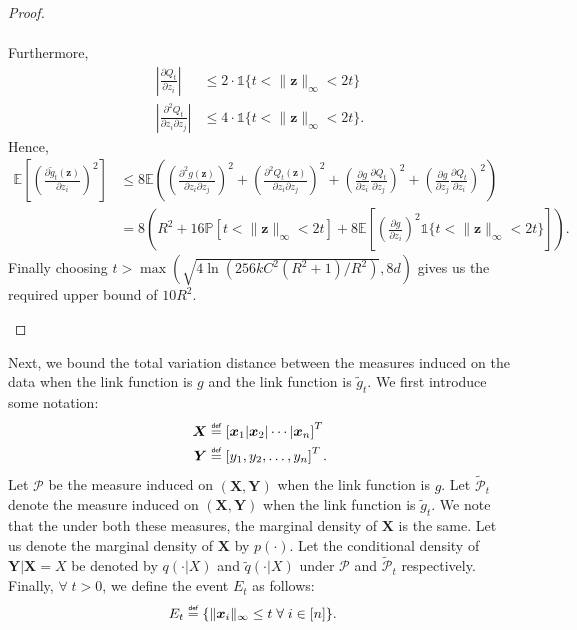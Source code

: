\documentclass[final,12pt]{colt2018} %
\newcommand{\E}{\mathbb{E}}
\newcommand{\Prob}{\mathbb{P}}
\newcommand{\explain}[2]{\mathrel{\overset{\makebox[0pt]{\mbox{\normalfont\tiny\sffamily #1}}}{#2}}}
\renewcommand\v[1]{{\ensuremath{\boldsymbol{#1}}}}
\newcommand{\indicator}[1]{\mathds{1}\{#1\}}
\begin{document}
\begin{proof}
\begin{enumerate}
\begin{align*}
    \end{align*}
    Furthermore,
    \begin{align*}
        \left|\frac{\partial Q_t}{\partial z_i}\right| & \leq  2 \cdot \indicator{ t <\|\v z\|_\infty< 2t} \\
        \left|\frac{\partial^2 Q_t}{\partial z_i\partial z_j}\right| & \leq  4 \cdot \indicator{ t <\|\v z\|_\infty< 2t}.
    \end{align*}
    Hence,
    \begin{align*}
        \E\left[\left( \frac{\partial \tilde{g}_t(\v z)}{\partial z_i}\right)^2\right] & \leq 8 \E \left( \left( \frac{\partial^2 g(\v z)}{\partial z_i \partial z_j}\right)^2 + \left( \frac{\partial^2 Q_t(\v z)}{\partial z_i \partial z_j}\right)^2 + \left(\frac{\partial g}{\partial z_i} \frac{\partial Q_t}{\partial z_j}\right)^2 + \left(\frac{\partial g}{\partial z_j} \frac{\partial Q_t}{\partial z_i}\right)^2 \right) \\
        & = 8 \left( R^2 + 16 \Prob \left[ t < \| \v z\|_\infty < 2t \right] + 8 \E \left[\left(\frac{\partial g}{\partial z_i}\right)^2 \indicator{ t < \| \v z\|_\infty < 2t} \right] \right).
    \end{align*}
    Finally choosing $t > \max(\sqrt{4 \ln(256kC^2(R^2+1)/R^2)},8d)$ gives us the required upper bound of $10R^2$.
\end{enumerate}
\end{proof}
Next, we bound the total variation distance between the measures induced on the data when the link function is $g$ and the link function is $\tilde{g}_t$. We first introduce some notation: 
\begin{align*}
    \v X & \explain{def}{=}  \left[\v x_1 | \v x_2 | \dotsb |\v x_n \right]^T \\
    \v Y & \explain{def}{=} \left[ y_1, y_2, \dotsc, y_n \right]^T.
\end{align*}
Let $\mathcal{P}$ be the measure induced on $(\v X, \v Y)$ when the link function is $g$. Let $\mathcal{\tilde{P}}_t$ denote the measure induced on $(\v X, \v Y)$ when the link function is $\tilde{g}_t$. We note that the under both these measures, the marginal density of $\v X$ is the same. Let us denote the marginal density of $\v X$ by $p(\cdot)$. Let the conditional density of $\v Y | \v X = X$ be denoted by $q(\cdot | X)$ and $\tilde{q}(\cdot|X)$ under $\mathcal{P}$ and $\mathcal{\tilde{P}}_t$ respectively.  Finally, $\forall \; t>0$, we define the event $E_t$ as follows: 
\begin{align*}
    E_t & \explain{def}{=} \{ \| \v x_i \|_\infty \leq t \; \forall \; i \in [n]\}.
\end{align*}
\end{document}

